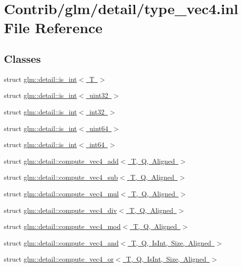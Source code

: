\hypertarget{type__vec4_8inl}{}\section{Contrib/glm/detail/type\+\_\+vec4.inl File Reference}
\label{type__vec4_8inl}
\subsection*{Classes}
\begin{DoxyCompactItemize}
\item 
struct \mbox{\hyperlink{structglm_1_1detail_1_1is__int}{glm\+::detail\+::is\+\_\+int$<$ T $>$}}
\item 
struct \mbox{\hyperlink{structglm_1_1detail_1_1is__int_3_01uint32_01_4}{glm\+::detail\+::is\+\_\+int$<$ uint32 $>$}}
\item 
struct \mbox{\hyperlink{structglm_1_1detail_1_1is__int_3_01int32_01_4}{glm\+::detail\+::is\+\_\+int$<$ int32 $>$}}
\item 
struct \mbox{\hyperlink{structglm_1_1detail_1_1is__int_3_01uint64_01_4}{glm\+::detail\+::is\+\_\+int$<$ uint64 $>$}}
\item 
struct \mbox{\hyperlink{structglm_1_1detail_1_1is__int_3_01int64_01_4}{glm\+::detail\+::is\+\_\+int$<$ int64 $>$}}
\item 
struct \mbox{\hyperlink{structglm_1_1detail_1_1compute__vec4__add}{glm\+::detail\+::compute\+\_\+vec4\+\_\+add$<$ T, Q, Aligned $>$}}
\item 
struct \mbox{\hyperlink{structglm_1_1detail_1_1compute__vec4__sub}{glm\+::detail\+::compute\+\_\+vec4\+\_\+sub$<$ T, Q, Aligned $>$}}
\item 
struct \mbox{\hyperlink{structglm_1_1detail_1_1compute__vec4__mul}{glm\+::detail\+::compute\+\_\+vec4\+\_\+mul$<$ T, Q, Aligned $>$}}
\item 
struct \mbox{\hyperlink{structglm_1_1detail_1_1compute__vec4__div}{glm\+::detail\+::compute\+\_\+vec4\+\_\+div$<$ T, Q, Aligned $>$}}
\item 
struct \mbox{\hyperlink{structglm_1_1detail_1_1compute__vec4__mod}{glm\+::detail\+::compute\+\_\+vec4\+\_\+mod$<$ T, Q, Aligned $>$}}
\item 
struct \mbox{\hyperlink{structglm_1_1detail_1_1compute__vec4__and}{glm\+::detail\+::compute\+\_\+vec4\+\_\+and$<$ T, Q, Is\+Int, Size, Aligned $>$}}
\item 
struct \mbox{\hyperlink{structglm_1_1detail_1_1compute__vec4__or}{glm\+::detail\+::compute\+\_\+vec4\+\_\+or$<$ T, Q, Is\+Int, Size, Aligned $>$}}

\end{DoxyCompactItemize}
